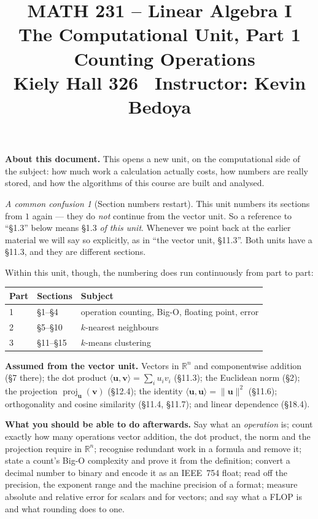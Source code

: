\documentclass[11pt]{article}
\title{\vspace{-1.2cm}\textbf{\sffamily MATH 231 -- Linear Algebra I}\\[4pt]
       {\large\sffamily The Computational Unit, Part 1 \textbullet\ Counting
        Operations}\\[2pt]
       {\normalsize\sffamily Kiely Hall 326 \textbullet\
        Instructor: Kevin Bedoya}}
\author{}
\date{}
\theoremstyle{plain}
\theoremstyle{definition}
\theoremstyle{remark}
\newtheorem*{warn}{A common confusion}
\newcommand{\R}{\mathbb{R}}
\newcommand{\vc}[1]{\mathbf{#1}}
\newcommand{\norm}[1]{\lVert #1\rVert}
\newcommand{\proj}[2]{\operatorname{proj}_{#1}(#2)}
\begin{document}
\maketitle
\vspace{-1.6cm}

\noindent\textbf{About this document.} This opens a new unit, on the
computational side of the subject: how much work a calculation actually costs,
how numbers are really stored, and how the algorithms of this course are built
and analysed.

\begin{warn}[Section numbers restart]
This unit numbers its sections from $1$ again --- they do \emph{not} continue
from the vector unit. So a reference to ``\S1.3'' below means \S1.3 \emph{of
this unit}. Whenever we point back at the earlier material we will say so
explicitly, as in ``the vector unit, \S11.3''. Both units have a \S11.3, and
they are different sections.

Within this unit, though, the numbering does run continuously from part to part:

\begin{center}
\renewcommand{\arraystretch}{1.2}
\begin{tabular}{@{}l l l@{}}
\toprule
\textbf{Part} & \textbf{Sections} & \textbf{Subject} \\
\midrule
1 & \S1--\S4    & operation counting, Big-O, floating point, error \\
2 & \S5--\S10   & $k$-nearest neighbours \\
3 & \S11--\S15  & $k$-means clustering \\
\bottomrule
\end{tabular}
\end{center}
\end{warn}

\medskip
\noindent\textbf{Assumed from the vector unit.} Vectors in $\R^{n}$ and
componentwise addition (\S7 there); the dot product
$\langle\vc{u},\vc{v}\rangle=\sum_i u_iv_i$ (\S11.3); the Euclidean norm
(\S2); the projection $\proj{\vc{u}}{\vc{v}}$ (\S12.4); the identity
$\langle\vc{u},\vc{u}\rangle=\norm{\vc{u}}^{2}$ (\S11.6); orthogonality and
cosine similarity (\S11.4, \S11.7); and linear dependence (\S18.4).

\medskip
\noindent\textbf{What you should be able to do afterwards.} Say what an
\emph{operation} is; count exactly how many operations vector addition, the dot
product, the norm and the projection require in $\R^{n}$; recognise redundant
work in a formula and remove it; state a count's Big-O complexity and prove it
from the definition; convert a decimal number to binary and encode it as an
IEEE~754 float; read off the precision, the exponent range and the machine
precision of a format; measure absolute and relative error for scalars and for
vectors; and say what a FLOP is and what rounding does to one.
\end{document}
